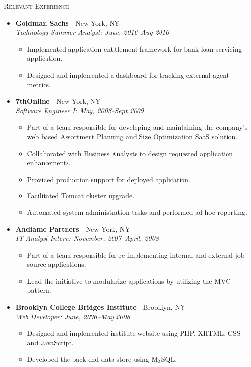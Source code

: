 \documentclass[11pt,oneside]{article}
\newenvironment{ressection}[1]{
	\vspace{4pt}
	{\fontfamily{phv}\selectfont\large\scshape#1}
	\begin{itemize}
	\vspace{3pt}
}{
	\end{itemize}
}
\newcommand{\ressubitem}[1]{
	\vspace{-2pt}
	\item \begin{flushleft} #1 \end{flushleft}
}
\newcommand{\resbigitem}[3]{
	\vspace{-5pt}
	\item
	\textbf{#1}---#2 \\
	\textit{#3}
}
\newenvironment{ressubsec}[3]{
	\resbigitem{#1}{#2}{#3}
	\vspace{-2pt}
	\begin{itemize}
}{
	\end{itemize}
}
\begin{document}
\begin{ressection}{Relevant Experience}
	\begin{ressubsec}{Goldman Sachs}{New York, NY}{Technology Summer Analyst: June, 2010--Aug 2010}
		\ressubitem{Implemented application entitlement framework for bank loan servicing application.}
		\ressubitem{Designed and implemented a dashboard for tracking external agent metrics.}
	\end{ressubsec}
	
	\begin{ressubsec}{7thOnline}{New York, NY}{Software Engineer I: May, 2008--Sept 2009}
		\ressubitem{Part of a team responsible for developing and maintaining the company's  web based Assortment Planning and Size Optimization SaaS solution.}
		\ressubitem{Collaborated with Business Analysts to design requested application enhancements.}
		\ressubitem{Provided production support for deployed application.}
		\ressubitem{Facilitated Tomcat cluster upgrade.}
		\ressubitem{Automated system administration tasks and performed ad-hoc reporting.}
	\end{ressubsec}
	
	\begin{ressubsec}{Andiamo Partners}{New York, NY}{IT Analyst Intern: November, 2007--April, 2008}
		\ressubitem{Part of a team responsible for re-implementing internal and external job source applications.}
		\ressubitem{Lead the initiative to modularize applications by utilizing the MVC pattern.}
	\end{ressubsec}
	
	\begin{ressubsec}{Brooklyn College Bridges Institute}{Brooklyn, NY}{Web Developer: June, 2006--May 2008}
		\ressubitem{Designed and implemented institute website using PHP, XHTML, CSS and JavaScript. }
		\ressubitem{Developed the back-end data store using MySQL.}
	\end{ressubsec}
	

\end{ressection}
\end{document}
